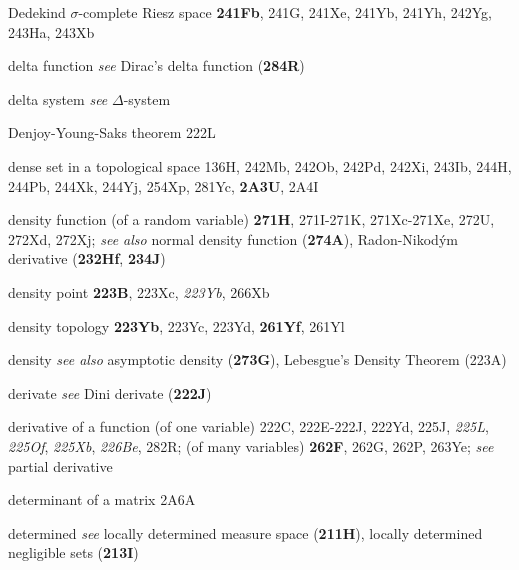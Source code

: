 




Dedekind $\sigma$-complete Riesz space {\bf 241Fb}, 241G, 241Xe, 241Yb, 241Yh, 242Yg, 243Ha, 243Xb




delta function {\it see} Dirac's delta function ({\bf 284R})


delta system {\it see} $\Delta$-system




Denjoy-Young-Saks theorem 222L


dense set in a topological space 136H,
242Mb, 242Ob, 242Pd, 242Xi, 243Ib, 244H, 244Pb, 244Xk, 244Yj, 254Xp, 281Yc,
{\bf 2A3U}, 2A4I










density function (of a random variable) {\bf 271H},
271I-271K, 
271Xc-271Xe, 
272U, 272Xd, 272Xj; 
  {\it see also} normal density function ({\bf 274A}),
Radon-Nikod\'ym derivative ({\bf 232Hf}, {\bf 234J})


density point {\bf 223B}, 223Xc, {\it 223Yb}, 266Xb


density topology {\bf 223Yb}, 223Yc, 223Yd, {\bf 261Yf},
261Yl


density {\it see also}
  asymptotic density ({\bf 273G}),
Lebesgue's Density Theorem (223A)









derivate {\it see} Dini derivate ({\bf 222J})


derivative of a function (of one variable) 222C,
222E-222J, 
222Yd, 225J, {\it 225L}, {\it 225Of}, {\it 225Xb}, {\it 226Be}, 282R;
  (of many variables) {\bf 262F}, 262G, 262P, 263Ye; 
  {\it see} partial derivative












determinant of a matrix 2A6A


determined {\it see} locally determined measure space ({\bf 211H}),
locally determined negligible sets ({\bf 213I})


